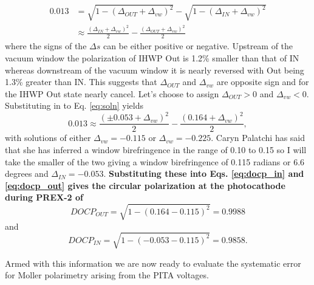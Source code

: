 \documentclass[12pt]{article}
\begin{document}
\begin{equation}
\label{eq:soln}
\begin{split}
0.013&=\sqrt{1-(\Delta_{OUT}+\Delta_{vw})^2}-\sqrt{1-(\Delta_{IN}+\Delta_{vw})^2}\\
~&\approx\frac{\left(\Delta_{IN}+\Delta_{vw}\right)^2}{2}-\frac{\left(\Delta_{OUT}+\Delta_{vw}\right)^2}{2}
\end{split}
\end{equation}
where the signs of the $\Delta s$ can be either positive or negative. Upstream of the vacuum window the polarization of IHWP Out is 1.2\% smaller than that of IN whereas downstream of the vacuum window it is nearly reversed with Out being 1.3\% greater than IN.  This suggests that $\Delta_{OUT}$ and $\Delta_{vw}$ are opposite sign and for the IHWP Out state nearly cancel.  Let's choose to assign $\Delta_{OUT}>0$ and $\Delta_{vw}<0$. Substituting in to Eq. \ref{eq:soln} yields
\begin{equation}
0.013 \approx \frac{\left(\pm0.053+\Delta_{vw}\right)^2}{2}-\frac{\left(0.164+\Delta_{vw}\right)^2}{2},
\end{equation}
with solutions of either $\Delta_{vw}=-0.115$ or $\Delta_{vw}=-0.225$. Caryn Palatchi has said that she has inferred a window birefringence in the range of 0.10 to 0.15 so I will take the smaller of the two giving a window birefringence of 0.115 radians or 6.6 degrees and $\Delta_{IN}=-0.053$.  \textbf{Substituting these into Eqs. \ref{eq:docp_in} and \ref{eq:docp_out}  gives the circular polarization at the photocathode during PREX-2 of }
\[DOCP_{OUT}=\sqrt{1-(0.164-0.115)^2}=0.9988
\]
 and 
 \[DOCP_{IN}=\sqrt{1-(-0.053-0.115)^2}=0.9858.
 \]

Armed with this information we are now ready to evaluate the systematic error for Moller polarimetry arising from the PITA voltages.
\end{document}
